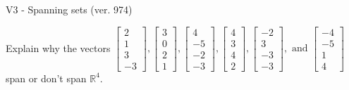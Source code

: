 \begin{exercise}
  \begin{exerciseTitle}V3 - Spanning sets (ver. 974)\end{exerciseTitle}
  \begin{exerciseStatement}
    Explain why the vectors \(\left[\begin{array}{r}
2 \\
1 \\
3 \\
-3
\end{array}\right] , \left[\begin{array}{r}
3 \\
0 \\
2 \\
1
\end{array}\right] , \left[\begin{array}{r}
4 \\
-5 \\
-2 \\
-3
\end{array}\right] , \left[\begin{array}{r}
4 \\
3 \\
4 \\
2
\end{array}\right] , \left[\begin{array}{r}
-2 \\
3 \\
-3 \\
-3
\end{array}\right] , \text{ and } \left[\begin{array}{r}
-4 \\
-5 \\
1 \\
4
\end{array}\right]\) span or don't span \(\mathbb{R}^4\). 
	



\end{exerciseStatement}
\end{exercise}
